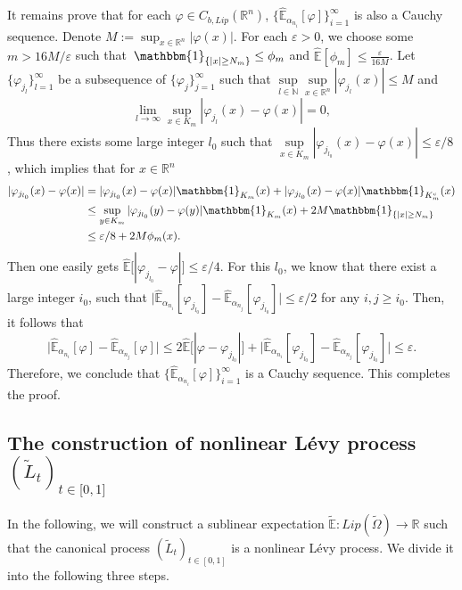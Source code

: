 \documentclass[a4paper,oneside,10pt]{article}%
\numberwithin{equation}{section}
\begin{document}
It remains prove that for each $\varphi \in C_{b,Lip}(\mathbb{R}^{n})$, $\{
\mathbb{\hat{E}}_{\alpha_{n_{i}}}[\varphi]\}_{i=1}^{\infty}$ is also a Cauchy
sequence. Denote $M:=\sup_{x\in \mathbb{R}^{n}}|\varphi(x)|$. For each
$\varepsilon>0$, we choose some $m>16M/\varepsilon$ such
that\ $\mathbbm{1}_{\{|x|\geq N_{m}\}}\leq \phi_{m}$ and $\mathbb{\hat{E}}%
[\phi_{m}]\leq \frac{\varepsilon}{16M}$. Let $\{ \varphi_{j_{l}}\}_{l=1}%
^{\infty}$ be a subsequence of $\{ \varphi_{j}\}_{j=1}^{\infty}$ such that
$\sup \limits_{l\in \mathbb{N}}\sup \limits_{x\in \mathbb{R}^{n}}|\varphi_{j_{l}%
}(x)|\leq M$ and
\[
\lim \limits_{l\rightarrow \infty}\sup \limits_{x\in K_{m}}|\varphi_{j_{l}%
}(x)-\varphi(x)|=0,
\]
Thus there exists some large integer $l_{0}$ such that $\sup \limits_{x\in
K_{m}}|\varphi_{j_{l_{0}}}(x)-\varphi(x)|\leq \varepsilon/8$, which implies
that for $x\in \mathbb{R}^{n}$
\begin{align*}
|\varphi_{j_{l_{0}}}(x)-\varphi(x)|  &  =|\varphi_{j_{l_{0}}}(x)-\varphi
(x)|\mathbbm{1}_{K_{m}}(x)+|\varphi_{j_{l_{0}}}(x)-\varphi
(x)|\mathbbm{1}_{K_{m}^{c}}(x)\\
&  \leq \sup \limits_{y\in K_{m}}|\varphi_{j_{l_{0}}}(y)-\varphi
(y)|\mathbbm{1}_{K_{m}}(x)+2M\mathbbm{1}_{\{|x|\geq N_{m}\}}\\
&  \leq \varepsilon/8+2M\phi_{m}(x).
\end{align*}
Then one easily gets $\mathbb{\hat{E}}\big[|\varphi_{j_{l_{0}}}-\varphi
|\big]\leq \varepsilon/4$. For this $l_{0}$, we know that there exist a large
integer $i_{0}$, such that $\big|\mathbb{\hat{E}}_{\alpha_{n_{i}}}%
[\varphi_{j_{l_{0}}}] -\mathbb{\hat{E}}_{\alpha_{n_{j}}}[\varphi_{j_{l_{0}}%
}]\big|\leq \varepsilon/2$ for any $i,j\geq i_{0}$. Then, it follows that
\[
\big|\mathbb{\hat{E}}_{\alpha_{n_{i}}}[\varphi]-\mathbb{\hat{E}}
_{\alpha_{n_{j}}}[\varphi]\big|\leq2\mathbb{\hat{E}}\big[|\varphi
-\varphi_{j_{l_{0}}}|\big]+\big|\mathbb{\hat{E}}_{\alpha_{n_{i}}}
[\varphi_{j_{l_{0}}}]-\mathbb{\hat{E}}_{\alpha_{n_{j}}}[\varphi_{j_{l_{0}}
}]\big|\leq \varepsilon.
\]
Therefore, we conclude that $\{ \mathbb{\hat{E}}_{\alpha_{n_{i}}}
[\varphi]\}_{i=1}^{\infty}$ is a Cauchy sequence. This completes the proof.

\subsection{The construction of nonlinear L\'evy process $(\tilde{L}%
_{t})_{t\in \lbrack0,1]}$}

In the following, we will construct a sublinear expectation $\mathbb{\tilde{
E}}:Lip(\tilde{\Omega})\rightarrow \mathbb{R}$ such that the canonical process
$(\tilde{L}_{t})_{t\in[0,1]}$ is a nonlinear L\'evy process.
We divide it into the following three steps.
\end{document}
